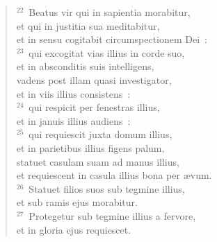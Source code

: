 \begin{flushleft}\begin{verse}${}^{22}$~Beatus vir qui in sapientia morabitur,\\ et qui in justitia sua meditabitur,\\ et in sensu cogitabit circumspectionem Dei~:\\
${}^{23}$~qui excogitat vias illius in corde suo,\\ et in absconditis suis intelligens,\\ vadens post illam quasi investigator,\\ et in viis illius consistens~:\\
${}^{24}$~qui respicit per fenestras illius,\\ et in januis illius audiens~:\\
${}^{25}$~qui requiescit juxta domum illius,\\ et in parietibus illius figens palum,\\ statuet casulam suam ad manus illius,\\ et requiescent in casula illius bona per \ae vum.\\
${}^{26}$~Statuet filios suos sub tegmine illius,\\ et sub ramis ejus morabitur.\\
${}^{27}$~Protegetur sub tegmine illius a fervore,\\ et in gloria ejus requiescet.\end{verse}\end{flushleft}


